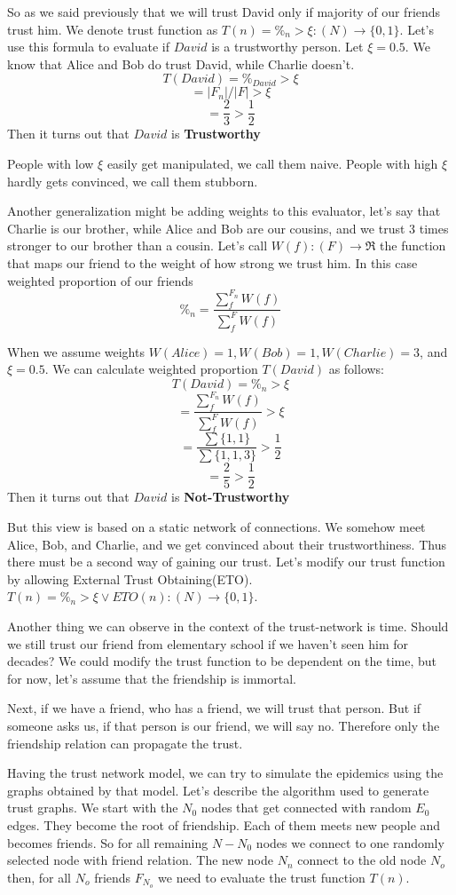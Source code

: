 \documentclass[nostrict]{szablonPG}
\begin{document}
So as we said previously that we will trust David only if majority of our friends trust him. We denote trust function as $T(n) = \%_n > \xi : (N) \rightarrow \{0,1\}$. 
Let's use this formula to evaluate if $David$ is a trustworthy person. Let $\xi = 0.5$. We know that Alice and Bob do trust David, while Charlie doesn't.
\[T(David) = \%_{David} > \xi\]
\[= |F_n|/|F| > \xi\]
\[= \frac{2}{3} > \frac{1}{2}\]
Then it turns out that $David$ is \textbf{Trustworthy}


People with low $\xi$ easily get manipulated, we call them naive.
People with high $\xi$ hardly gets convinced, we call them stubborn. 

Another generalization might be adding weights to this evaluator, let's say that Charlie is our brother, while Alice and Bob are our cousins, and we trust 3 times stronger to our brother than a cousin. Let's call $W(f): (F) \rightarrow \Re$ the function that maps our friend to the weight of how strong we trust him. In this case weighted proportion of our friends \[\%_n = \frac{\sum\limits_f^{F_n} W(f)}{\sum\limits_f^{F} W(f)}\]

When we assume weights $W(Alice) = 1, W(Bob) = 1, W(Charlie) = 3$, and $\xi = 0.5$. We can calculate weighted proportion $T(David)$ as follows:
\[T(David) = \%_n > \xi\]
\[= \frac{\sum\limits_f^{F_n} W(f)}{\sum\limits_f^{F} W(f)} > \xi\]
\[= \frac{\sum \{1,1\}}{\sum\{1,1,3\}} > \frac{1}{2}\]
\[= \frac{2}{5} > \frac{1}{2}\]
Then it turns out that $David$ is \textbf{Not-Trustworthy}

But this view is based on a static network of connections. We somehow meet Alice, Bob, and Charlie, and we get convinced about their trustworthiness. Thus there must be a second way of gaining our trust. Let's modify our trust function by allowing External Trust Obtaining(ETO). $T(n) = \%_n > \xi \lor ETO(n) : (N) \rightarrow \{0,1\}$.

Another thing we can observe in the context of the trust-network is time. Should we still trust our friend from elementary school if we haven't seen him for decades? We could modify the trust function to be dependent on the time, but for now, let's assume that the friendship is immortal.

Next, if we have a friend, who has a friend, we will trust that person. But if someone asks us, if that person is our friend, we will say no. Therefore only the friendship relation can propagate the trust.

Having the trust network model, we can try to simulate the epidemics using the graphs obtained by that model. Let's describe the algorithm used to generate trust graphs.
We start with the $N_0$ nodes that get connected with random $E_0$ edges. They become the root of friendship. Each of them meets new people and becomes friends. So for all remaining $N - N_0$ nodes we connect to one randomly selected node with friend relation. The new node $N_n$ connect to the old node $N_o$ then, for all $N_o$ friends $F_{N_o}$ we need to evaluate the trust function $T(n)$.
\end{document}
